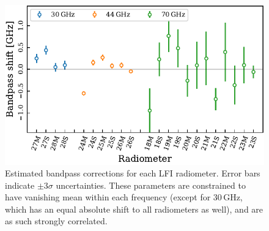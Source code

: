 \documentclass[twocolumn]{aa}
\newcommand{\?}[1]{\textcolor{red}{{\bf [#1]}}}
\begin{document}
  
  \begin{figure} %
    \center
    \includegraphics[width=\linewidth]{figs/bpshifts_BP10tune.pdf}
    \caption{Estimated bandpass corrections for each LFI radiometer. Error bars indicate $\pm3\sigma$ uncertainties. These parameters are constrained to have vanishing mean within each frequency (except for 30\,GHz, which has an equal absolute shift to all radiometers as well), and are as such strongly correlated.}
    \label{fig:bpshiftfinal}
  \end{figure}
  
\end{document}
